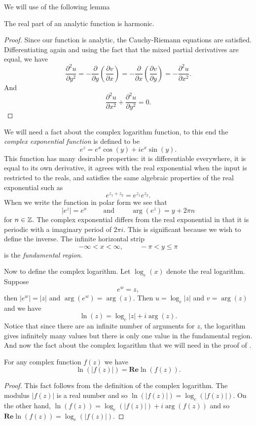 We will use of the following lemma
\begin{lemma}\label{lem:anal-harmonic}
	The real part of an analytic function is harmonic.
\end{lemma}
\begin{proof}
	Since our function is analytic, the Cauchy-Riemann equations are satisfied.
	Differentiating again and using the fact that the mixed partial derivatives are equal,
	we have
	$$\frac{\partial^2 u}{\partial y^2}=-\frac{\partial}{\partial y}\left(\frac{\partial v}{\partial x}\right)
	=-\frac{\partial}{\partial x}\left(\frac{\partial v}{\partial y}\right)=-\frac{\partial^2 u}{\partial x^2}.$$
	And $$\frac{\partial^2 u}{\partial x^2}+\frac{\partial^2 u}{\partial y^2}=0.$$
\end{proof}

We will need a fact about the complex logarithm function, to this end the 
\emph{complex exponential function} is defined to be
$$e^z=e^x\cos(y)+ie^x\sin(y).$$
This function has many desirable properties: it is differentiable everywhere,
it is equal to its own derivative, it agrees with the real exponential when the
input is restricted to the reals, and satisfies the same algebraic properties
of the real exponential such as $$e^{z_1+z_2}=e^{z_1}e^{z_2}.$$
When we write the function in polar form we see that
$$|e^z|=e^x\hspace{1cm} \textrm{and} \hspace{1cm} \arg(e^z)=y+2\pi n$$
for $n\in \mathbb{Z}.$
The complex exponential differs from the real exponential in that 
it is periodic with a imaginary period of $2\pi i.$ This is significant because
we wish to define the inverse. The infinite horizontal
strip $$-\infty<x<\infty, \hspace{1cm} -\pi< y\leq \pi$$ is the \emph{fundamental region}.

Now to define the complex logarithm. Let $\log_e(x)$ denote the real logarithm.
Suppose $$e^w=z,$$
then $|e^w|=|z|$ and $\arg(e^w)=\arg(z)$. Then $u=\log_e|z|$ and $v=\arg(z)$
and we have $$\ln(z)=\log_e|z|+i\arg(z).$$
Notice that since there are an infinite number of arguments for $z$, the logarithm
gives infinitely many values but there is only one value in the fundamental region.
 And now the fact about the complex
logarithm that we will need in the proof of .
\begin{lemma}\label{lem:log-fact}
	For any complex function $f(z)$ we have
	$$\ln(|f(z)|)=\textbf{Re}\ln(f(z)).$$
\end{lemma}
\begin{proof}
	This fact follows from the definition of the complex logarithm.
	The modulus $|f(z)|$ is a real number and so $\ln(|f(z)|)=\log_e(|f(z)|)$.
	On the other hand, $\ln(f(z))=\log_e(|f(z)|)+i\arg(f(z))$ and so
	$\textbf{Re}\ln(f(z))=\log_e(|f(z)|).$
\end{proof}


